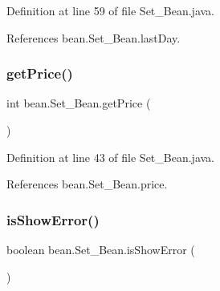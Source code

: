 Definition at line 59 of file Set\+\_\+\+Bean.\+java.


\begin{DoxyCode}{0}

\end{DoxyCode}


References bean.\+Set\+\_\+\+Bean.\+last\+Day.

\mbox{\label{classbean_1_1Set__Bean_a336e607ada67dc0cbea19914fd8a93b0}} 
\subsubsection{\texorpdfstring{getPrice()}{getPrice()}}
{\footnotesize\ttfamily int bean.\+Set\+\_\+\+Bean.\+get\+Price (\begin{DoxyParamCaption}{ }\end{DoxyParamCaption})}



Definition at line 43 of file Set\+\_\+\+Bean.\+java.


\begin{DoxyCode}{0}

\end{DoxyCode}


References bean.\+Set\+\_\+\+Bean.\+price.

\mbox{\label{classbean_1_1Set__Bean_a84574fb21d6564cf7af43ebaa4cf8342}} 
\subsubsection{\texorpdfstring{isShowError()}{isShowError()}}
{\footnotesize\ttfamily boolean bean.\+Set\+\_\+\+Bean.\+is\+Show\+Error (\begin{DoxyParamCaption}{ }\end{DoxyParamCaption})}



